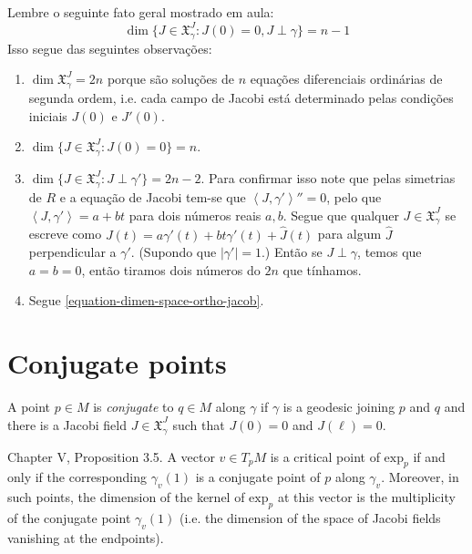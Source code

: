 \documentclass{book}
\begin{document}
\begin{remark}
\label{remark-dimen-space-jacob-field}
Lembre o seguinte fato geral mostrado em
aula:
\begin{equation}
\label{equation-dimen-space-ortho-jacob}
\dim\{J \in \mathfrak{X}^J_\gamma:J(0)=0, J
\perp \gamma\}=n-1
\end{equation}
Isso segue das seguintes observações:
\begin{enumerate}
\item $\dim\mathfrak{X}^J_\gamma=2n$ porque
são soluções de $n$ equações
diferenciais ordinárias de segunda ordem,
i.e. cada campo de Jacobi está
determinado pelas condições iniciais $J(0)$ e
$J'(0)$.
\item $\dim \{J \in
\mathfrak{X}^J_\gamma:J(0)=0\}=n$.
\item $\dim \{J \in
\mathfrak{X}^J_\gamma:J\perp \gamma'\}=2n-2$.
Para
confirmar isso note que pelas simetrias de
$R$ e a equação de Jacobi tem-se
que $\left\langle{}J,\gamma'\right\rangle{}''=0$, pelo que
$\left\langle{}J,\gamma'\right\rangle{}=a+bt$
para dois números reais $a,b$. Segue que
qualquer $J \in
\mathfrak{X}^J_\gamma$ se escreve como
$J(t)=a\gamma'(t)+bt\gamma'(t)+\hat{J}(t)$
para algum $\hat{J}$
perpendicular a  $\gamma'$. (Supondo que
$|\gamma'|=1$.) Então se $J \perp
\gamma$, temos que  $a=b=0$, então tiramos
dois números do $2n$ que
tínhamos.
\item Segue
\ref{equation-dimen-space-ortho-jacob}.
\end{enumerate}

\end{remark}


\section{Conjugate points}
\label{section-conjugate-points}

\begin{definition}
\label{definition-conjugate-points}
A point $p \in M$ is {\it conjugate} to $q
\in M$ along $\gamma$ if $\gamma$ is
a geodesic joining $p$ and $q$ and there is a
Jacobi field
$J\in\mathfrak{X}_\gamma^J$ such that
$J(0)=0$ and  $J(\ell)=0$.
\end{definition}

\begin{proposition}
\label{proposition-critical-points-exp}
\cite{doc} Chapter V, Proposition 3.5. A
vector $v \in T_pM$ is a critical
point of $\text{exp}_p$ if and only if the
corresponding
$\gamma_v(1)$ is a conjugate point of $p$
along $\gamma_v$.
Moreover, in such points, the dimension of
the kernel of
$\text{exp}_p$ at this vector is the
multiplicity
of the conjugate point $\gamma_v(1)$
(i.e. the dimension of the space of Jacobi
fields vanishing
at the endpoints).
\end{proposition}
\end{document}
